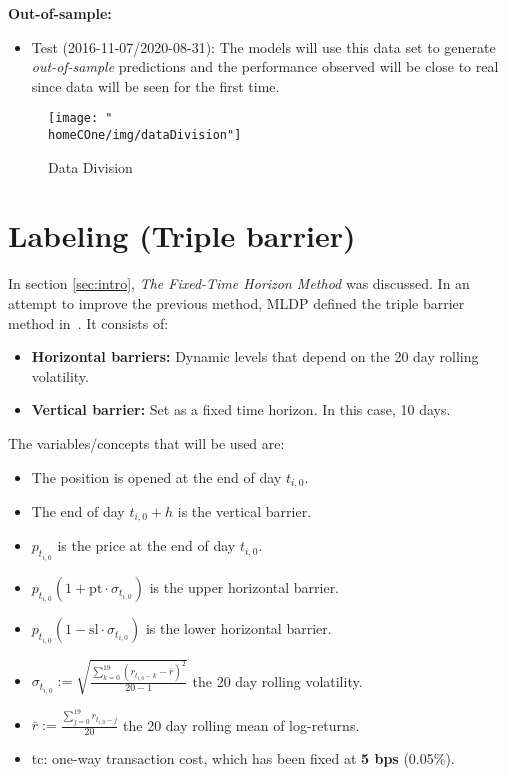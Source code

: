 \documentclass[a4paper]{report}
\newcommand{\homeCOne}{../../Chapter 1 - Metalabeling/Draft}
\begin{document}
\textbf{Out-of-sample:}
\begin{itemize}
	\item Test (2016-11-07/2020-08-31): The models will use this data set to 
	generate \textit{out-of-sample} predictions and the performance observed 
	will be close to real since data will be seen for the first time.
\end{itemize}

\begin{figure}[htbp]
	\centering
	\texttt{[image: "\\homeCOne/img/dataDivision"]}
	\caption{Data Division}
	\label{fig:dataDivision}
\end{figure}	

\section{Labeling (Triple barrier)}
\label{sec:tripleBarrier}
In section \ref{sec:intro}, \textit{The Fixed-Time Horizon Method} was 
discussed. In an attempt to improve the previous method, MLDP defined the 
triple barrier method in~\cite{AdvFML}. It consists of:
\begin{itemize}
	\item \textbf{Horizontal barriers:} Dynamic levels that depend on 
	the 20 day rolling volatility.
	\item \textbf{Vertical barrier:} Set as a fixed time horizon. In 
	this case, 10 days.
\end{itemize}

The variables/concepts that will be used are:
\begin{itemize}
	\item The position is opened at the end of day $t_{i,0}$.
	
	\item The end of day $t_{i,0} + h$ is the vertical barrier.

	\item $p_{t_{i,0}}$ is the price at the end of day $t_{i,0}$.

	\item $p_{t_{i,0}} (1 + \text{pt} \cdot \sigma_{t_{i,0}})$ is 
	the upper horizontal barrier.

	\item $p_{t_{i,0}} (1 - \text{sl} \cdot \sigma_{t_{i,0}})$ is 
	the lower horizontal barrier.

	\item $\sigma_{t_{i,0}} := \sqrt{ \frac{\sum_{k=0}^{19}
	(r_{t_{i,0}-k} - \bar{r})^2}{20 - 1} }$ the 20 day rolling volatility.

	\item $\bar{r} := \frac{\sum_{j = 0}^{19} r_{t_{i,0} - j}}{20}$ the 20 
	day rolling mean of log-returns.

	\item tc: one-way transaction cost, which has been fixed at 
	\textbf{5 bps} (0.05\%).
\end{itemize}
\end{document}

